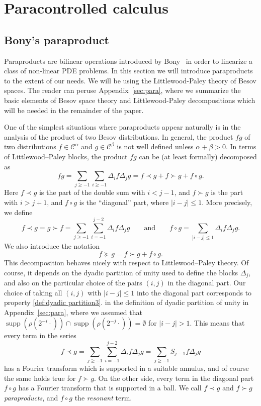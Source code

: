 \documentclass[11pt,a4paper]{article}
\newcommand{\cdummy}{\cdot}
\newcommand{\tmop}[1]{\ensuremath{\operatorname{#1}}}
\newcommand{\tmtextit}[1]{{\itshape{#1}}}
\theoremstyle{remark}
\newcommand{\CC}{\ensuremath{\mathscr{C}}}
\begin{document}
\section{Paracontrolled calculus}\label{sec:paracontrolled}


\subsection{Bony's paraproduct}\label{sec:bony}

Paraproducts are bilinear operations introduced by Bony~\cite{Bony1981} in order to linearize a class of non-linear PDE problems. In this section we will introduce paraproducts to the extent of our needs. We will be using the Littlewood-Paley theory of Besov spaces. The reader can peruse Appendix~\ref{sec:para}, where we summarize the basic elements of Besov space theory and Littlewood-Paley decompositions which will be needed in the remainder of the paper.

 One of the simplest situations where paraproducts appear naturally is in the analysis of the product of two Besov distributions. 
In general, the product $f g$ of two distributions $f \in \CC^{\alpha}$ and $g \in \CC^{\beta}$ is not well defined unless $\alpha + \beta >0$. In terms of Littlewood--Paley blocks, the product $f g$ can be (at least formally) decomposed as
\[
   fg= \sum_{j \geqslant -1} \sum_{i \geqslant -1} \Delta_{i} f \Delta_{j} g=f \prec g+f \succ g+f \circ g.
\]
Here $f \prec g$ is the part of the double sum with $i<j-1$, and $f \succ g$ is the part with $i>j+1$, and $f \circ g$ is the ``diagonal'' part, where $|i-j | \leqslant 1$. More precisely, we define
\[
   f \prec g= g\succ f = \sum_{j \geqslant -1} \sum_{i=-1}^{j-2} \Delta_{i} f \Delta_{j} g \qquad \text{and}\qquad
   f \circ g= \sum_{| i-j | \leqslant 1} \Delta_{i} f \Delta_{j} g.
\]
We also introduce the notation
\[
   f \succcurlyeq g=f \succ g+f \circ g.
\]
This decomposition  behaves nicely with respect to Littlewood--Paley theory. Of course, it depends on the dyadic partition of unity used to define the blocks $\Delta_{j}$, and also on the particular choice of the pairs $( i,j )$ in the diagonal part. Our choice of taking all $(i,j)$ with $| i-j| \leqslant 1$ into the diagonal part corresponds to property \ref{def:dyadic partition3}. in the definition of dyadic partition of unity in Appendix~\ref{sec:para},  where we assumed that $\tmop{supp} ( \rho ( 2^{-i} \cdummy ) ) \cap \tmop{supp} ( \rho ( 2^{-j} \cdummy ) ) = \emptyset$ for $| i-j | >1$. This means that every term in the series
\[
   f \prec g = \sum_{j \geqslant -1} \sum_{i=-1}^{j-2} \Delta_{i} f \Delta_{j} g= \sum_{j \geqslant -1} S_{j-1} f \Delta_{j} g
\]
has a Fourier transform which is supported in a suitable annulus, and of course the same holds true for $f \succ g$. On the other side, every term in the diagonal part $f \circ g$ has a Fourier transform that is supported in a ball. We call $f \prec g$ and $f \succ g$ \tmtextit{paraproducts}, and $f \circ g$ the \tmtextit{resonant} term.
\end{document}
